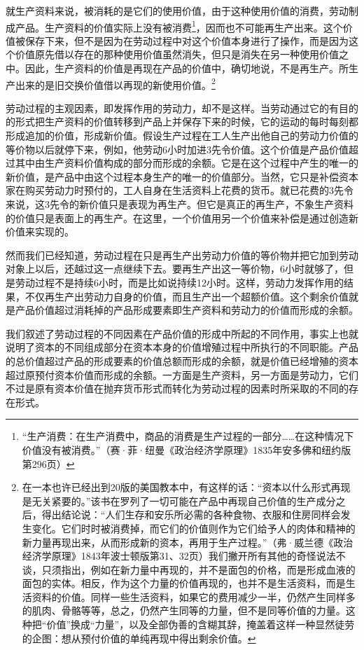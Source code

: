 \documentclass{ctexbook}
\begin{document}
就生产资料来说，被消耗的是它们的使用价值，由于这种使用价值的消费，劳动制成产品。生产资料的价值实际上没有被消费\footnote{“生产消费：在生产消费中，商品的消费是生产过程的一部分……在这种情况下价值没有被消费。”（赛·菲·纽曼《政治经济学原理》1835年安多佛和纽约版第296页）}，因而也不可能再生产出来。这个价值被保存下来，但不是因为在劳动过程中对这个价值本身进行了操作，而是因为这个价值原先借以存在的那种使用价值虽然消失，但只是消失在另一种使用价值之中。因此，生产资料的价值是再现在产品的价值中，确切地说，不是再生产。所生产出来的是旧交换价值借以再现的新使用价值。\footnote{在一本也许已经出到20版的美国教本中，有这样的话：“资本以什么形式再现是无关紧要的。”该书在罗列了一切可能在产品中再现自己价值的生产成分之后，得出结论说：“人们生存和安乐所必需的各种食物、衣服和住房同样会发生变化。它们时时被消费掉，而它们的价值则作为它们给予人的肉体和精神的新力量再现出来，从而形成新的资本，再用于生产过程。”（弗·威兰德《政治经济学原理》1843年波士顿版第31、32页）我们撇开所有其他的奇怪说法不谈，只须指出，例如在新力量中再现的，并不是面包的价格，而是形成血液的面包的实体。相反，作为这个力量的价值再现的，也并不是生活资料，而是生活资料的价值。同样一些生活资料，如果它的费用减少一半，仍然产生同样多的肌肉、骨骼等等，总之，仍然产生同等的力量，但不是同等价值的力量。这种把“价值”换成“力量”，以及全部伪善的含糊其辞，掩盖着这样一种显然徒劳的企图：想从预付价值的单纯再现中得出剩余价值。}

劳动过程的主观因素，即发挥作用的劳动力，却不是这样。当劳动通过它的有目的的形式把生产资料的价值转移到产品上并保存下来的时候，它的运动的每时每刻都形成追加的价值，形成新价值。假设生产过程在工人生产出他自己的劳动力价值的等价物以后就停下来，例如，他劳动6小时加进3先令价值。这个价值是产品价值超过其中由生产资料价值构成的部分而形成的余额。它是在这个过程中产生的唯一的新价值，是产品中由这个过程本身生产的唯一的价值部分。当然，它只是补偿资本家在购买劳动力时预付的，工人自身在生活资料上花费的货币。就已花费的3先令来说，这3先令的新价值只是表现为再生产。但它是真正的再生产，不象生产资料的价值只是表面上的再生产。在这里，一个价值用另一个价值来补偿是通过创造新价值来实现的。

然而我们已经知道，劳动过程在只是再生产出劳动力价值的等价物并把它加到劳动对象上以后，还越过这一点继续下去。要再生产出这一等价物，6小时就够了，但是劳动过程不是持续6小时，而是比如说持续12小时。这样，劳动力发挥作用的结果，不仅再生产出劳动力自身的价值，而且生产出一个超额价值。这个剩余价值就是产品价值超过消耗掉的产品形成要素即生产资料和劳动力的价值而形成的余额。

我们叙述了劳动过程的不同因素在产品价值的形成中所起的不同作用，事实上也就说明了资本的不同组成部分在资本本身的价值增殖过程中所执行的不同职能。产品的总价值超过产品的形成要素的价值总额而形成的余额，就是价值已经增殖的资本超过原预付资本价值而形成的余额。一方面是生产资料，另一方面是劳动力，它们不过是原有资本价值在抛弃货币形式而转化为劳动过程的因素时所采取的不同的存在形式。
\end{document}
